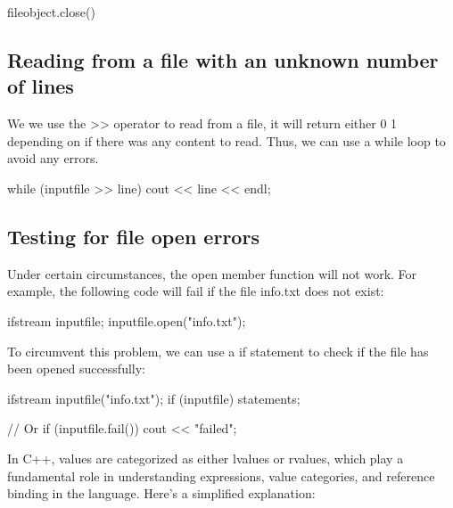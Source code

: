 \documentclass{report}
\begin{document}
    \begin{cppcode}
fileobject.close()
    \end{cppcode}
    

    \pagebreak
    \subsection{Reading from a file with an unknown number of lines}
    \bigbreak \noindent 
    We we use the >> operator to read from a file, it will return either 0 1 depending on if there was any content to read. Thus, we can use a while loop to avoid any errors.
    \bigbreak \noindent 
    
    \begin{cppcode}
while (inputfile >> line){
    cout << line << endl;
}
    \end{cppcode}
    

    \bigbreak \noindent 
    \subsection{Testing for file open errors}
    \bigbreak \noindent 
    Under certain circumstances, the open member function will not work. For example, the following code will fail if the file info.txt does not exist:
    \bigbreak \noindent 
    
    \begin{cppcode}
ifstream inputfile;
inputfile.open("info.txt");
    \end{cppcode}
    
    \bigbreak \noindent 
    To circumvent this problem, we can use a if statement to check if the file has been opened successfully:
    \bigbreak \noindent 
    
    \begin{cppcode}
ifstream inputfile("info.txt");
if (inputfile){
    statements;
}

// Or
if (inputfile.fail()) {
    cout << "failed";
}
    \end{cppcode}
    

    \pagebreak
    \bigbreak \noindent 
    In C++, values are categorized as either lvalues or rvalues, which play a fundamental role in understanding expressions, value categories, and reference binding in the language.
    \bigbreak \noindent 
    Here's a simplified explanation:

    \bigbreak \noindent 
\end{document}
